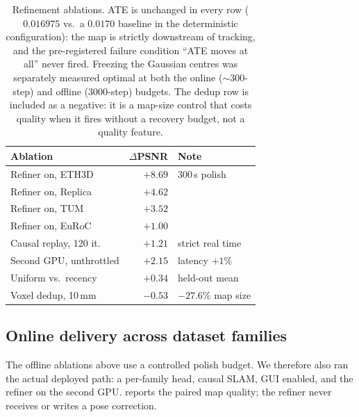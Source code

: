 \begin{table}[t]
\centering\small
\setlength{\tabcolsep}{4pt}
\begin{tabular}{@{}lrl@{}}
\toprule
Ablation & $\Delta$PSNR & Note \\
\midrule
Refiner on, ETH3D   & $+8.69$ & 300\,s polish \\
Refiner on, Replica & $+4.62$ & \\
Refiner on, TUM     & $+3.52$ & \\
Refiner on, EuRoC   & $+1.00$ & \\
\midrule
Causal replay, 120 it. & $+1.21$ & strict real time \\
Second GPU, unthrottled & $+2.15$ & latency $+1\%$ \\
\midrule
Uniform vs.\ recency & $+0.34$ & held-out mean \\
Voxel dedup, 10\,mm & $-0.53$ & $-27.6\%$ map size \\
\bottomrule
\end{tabular}
\caption{Refinement ablations. ATE is unchanged in every row
($0.016975$ vs.\ a $0.0170$ baseline in the deterministic configuration): the
map is strictly downstream of tracking, and the pre-registered failure
condition ``ATE moves at all'' never fired. Freezing the Gaussian centres was
separately measured optimal at both the online ($\sim$300-step) and offline
(3000-step) budgets. The dedup row is included as a negative: it is a map-size
control that costs quality when it fires without a recovery budget, not a
quality feature.}
\label{tab:refiner}
\end{table}

\subsection{Online delivery across dataset families}
\label{sec:exp:online}
The offline ablations above use a controlled polish budget. We therefore also
ran the actual deployed path: a per-family head, causal SLAM, GUI enabled, and
the refiner on the second GPU.  reports the paired map
quality; the refiner never receives or writes a pose correction.


